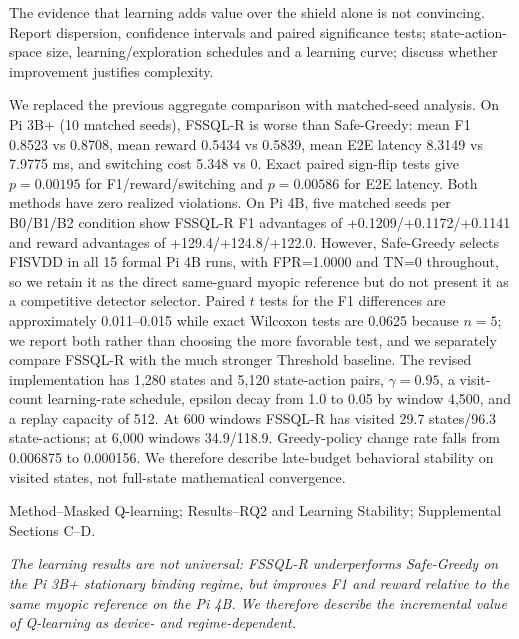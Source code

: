 \documentclass[11pt,a4paper]{article}
\newcommand{\commentbox}[1]{\begin{rcommentbox}#1\end{rcommentbox}}
\newcommand{\responsebox}[1]{\begin{authorresponsebox}#1\end{authorresponsebox}}
\newcommand{\changebox}[1]{\begin{wherebox}#1\end{wherebox}}
\begin{document}
\commentbox{The evidence that learning adds value over the shield alone is not convincing. Report dispersion, confidence intervals and paired significance tests; state-action-space size, learning/exploration schedules and a learning curve; discuss whether improvement justifies complexity.}
\responsebox{We replaced the previous aggregate comparison with matched-seed analysis. On Pi 3B+ (10 matched seeds), FSSQL-R is worse than Safe-Greedy: mean F1 0.8523 vs 0.8708, mean reward 0.5434 vs 0.5839, mean E2E latency 8.3149 vs 7.9775 ms, and switching cost 5.348 vs 0. Exact paired sign-flip tests give $p=0.00195$ for F1/reward/switching and $p=0.00586$ for E2E latency. Both methods have zero realized violations. On Pi 4B, five matched seeds per B0/B1/B2 condition show FSSQL-R F1 advantages of +0.1209/+0.1172/+0.1141 and reward advantages of +129.4/+124.8/+122.0. However, Safe-Greedy selects FISVDD in all 15 formal Pi 4B runs, with FPR=1.0000 and TN=0 throughout, so we retain it as the direct same-guard myopic reference but do not present it as a competitive detector selector. Paired $t$ tests for the F1 differences are approximately 0.011--0.015 while exact Wilcoxon tests are 0.0625 because $n=5$; we report both rather than choosing the more favorable test, and we separately compare FSSQL-R with the much stronger Threshold baseline. The revised implementation has 1,280 states and 5,120 state-action pairs, $\gamma=0.95$, a visit-count learning-rate schedule, epsilon decay from 1.0 to 0.05 by window 4,500, and a replay capacity of 512. At 600 windows FSSQL-R has visited 29.7 states/96.3 state-actions; at 6,000 windows 34.9/118.9. Greedy-policy change rate falls from 0.006875 to 0.000156. We therefore describe late-budget behavioral stability on visited states, not full-state mathematical convergence.}
\changebox{Method--Masked Q-learning; Results--RQ2 and Learning Stability; Supplemental Sections C--D.}
\begin{excerptbox}
\emph{The learning results are not universal: FSSQL-R underperforms Safe-Greedy on the Pi 3B+ stationary binding regime, but improves F1 and reward relative to the same myopic reference on the Pi 4B. We therefore describe the incremental value of Q-learning as device- and regime-dependent.}
\end{excerptbox}
\end{document}
